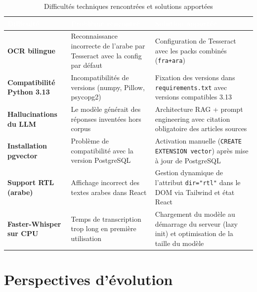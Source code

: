 \documentclass[12pt,a4paper]{report}
\begin{document}
\begin{table}[H]
\centering
\caption{Difficultés techniques rencontrées et solutions apportées}
\label{tab:difficultes}
\renewcommand{\arraystretch}{1.35}
\begin{tabularx}{\linewidth}{>{\small\bfseries}p{3.2cm} X X}
\arrayrulecolor{darkblue}\hline
\rowcolor{tableheader}
\textcolor{white}{\textbf{Difficulté}} &
\textcolor{white}{\textbf{Problème rencontré}} &
\textcolor{white}{\textbf{Solution apportée}} \\
\hline
\rowcolor{tableroweven} OCR bilingue & Reconnaissance incorrecte de l'arabe par Tesseract avec la config par défaut & Configuration de Tesseract avec les packs combinés (\texttt{fra+ara}) \\
\hline
\rowcolor{tablerowodd} Compatibilité Python 3.13 & Incompatibilités de versions (numpy, Pillow, psycopg2) & Fixation des versions dans \texttt{requirements.txt} avec versions compatibles 3.13 \\
\hline
\rowcolor{tableroweven} Hallucinations du LLM & Le modèle générait des réponses inventées hors corpus & Architecture RAG + prompt engineering avec citation obligatoire des articles sources \\
\hline
\rowcolor{tablerowodd} Installation pgvector & Problème de compatibilité avec la version PostgreSQL & Activation manuelle (\texttt{CREATE EXTENSION vector}) après mise à jour de PostgreSQL \\
\hline
\rowcolor{tableroweven} Support RTL (arabe) & Affichage incorrect des textes arabes dans React & Gestion dynamique de l'attribut \texttt{dir="rtl"} dans le DOM via Tailwind et état React \\
\hline
\rowcolor{tablerowodd} Faster-Whisper sur CPU & Temps de transcription trop long en première utilisation & Chargement du modèle au démarrage du serveur (lazy init) et optimisation de la taille du modèle \\
\hline
\end{tabularx}
\end{table}

\section{Perspectives d'évolution}
\end{document}
